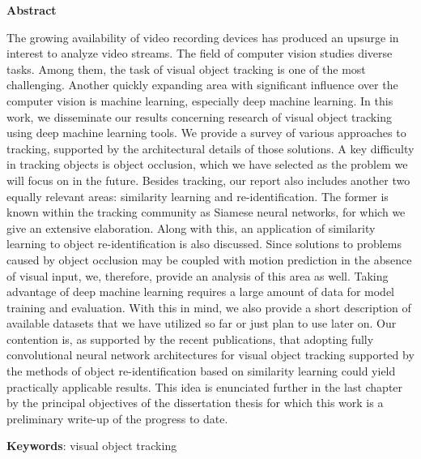 \thispagestyle{plain}

\begin{center}
    \Large{\textbf{Abstract}}
\end{center}


The growing availability of video recording devices has produced an upsurge in interest to analyze video streams. The field of computer vision studies diverse tasks. Among them, the task of visual object tracking is one of the most challenging. Another quickly expanding area with significant influence over the computer vision is machine learning, especially deep machine learning. In this work, we disseminate our results concerning research of visual object tracking using deep machine learning tools. We provide a survey of various approaches to tracking, supported by the architectural details of those solutions. A key difficulty in tracking objects is object occlusion, which we have selected as the problem we will focus on in the future. Besides tracking, our report also includes another two equally relevant areas: similarity learning and re-identification. The former is known within the tracking community as Siamese neural networks, for which we give an extensive elaboration. Along with this, an application of similarity learning to object re-identification is also discussed. Since solutions to problems caused by object occlusion may be coupled with motion prediction in the absence of visual input, we, therefore, provide an analysis of this area as well. Taking advantage of deep machine learning requires a large amount of data for model training and evaluation. With this in mind, we also provide a short description of available datasets that we have utilized so far or just plan to use later on. Our contention is, as supported by the recent publications, that adopting fully convolutional neural network architectures for visual object tracking supported by the methods of object re-identification based on similarity learning could yield practically applicable results. This idea is enunciated further in the last chapter by the principal objectives of the dissertation thesis for which this work is a preliminary write-up of the progress to date.

\noindent \textbf{Keywords}: visual object tracking

